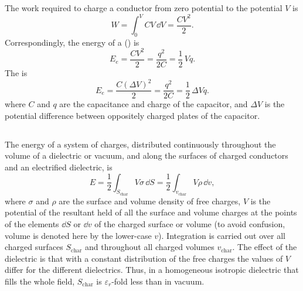 The work required to charge a conductor from zero potential to the potential $V$ is
\begin{equation*}%
W = \int_{0}^{V} CV \, \dd V = \frac{CV^{2}}{2}.
\end{equation*}
Correspondingly, the energy of a  () is
\begin{equation*}%
E_{e} = \frac{CV^{2}}{2} = \frac{q^{2}}{2C} = \frac{1}{2} \, Vq.
\end{equation*}
The  is
\begin{equation*}%
E_{e} = \frac{C(\Delta V)^{2}}{2} = \frac{q^{2}}{2C} = \frac{1}{2} \,\Delta Vq.
\end{equation*}
where $C$ and $q$ are the capacitance and charge of the capacitor, and $\Delta V$ is the potential difference between oppositely charged plates of the capacitor.

\subsection{}\label{19.1.2} The energy of a system of charges, distributed continuously throughout the volume of a dielectric or vacuum, and along the surfaces of charged conductors and an electrified dielectric, is
\begin{equation*}%
E = \frac{1}{2} \int_{S_{\text{char}}} V \sigma \, \dd S = \frac{1}{2} \int_{v_{\text{char}}} V \rho \, \dd v, 
\end{equation*}
where $\sigma$ and $\rho$ are the surface and volume density of free charges, $V$ is the potential of the resultant held of all the surface and volume charges at the points of the elements $\dd S$ or $\dd v$ of the charged surface or volume (to avoid confusion, volume is denoted here by the lower-case $v$). Integration is carried out over all charged surfaces $S_{\text{char}}$ and throughout all charged volumes $v_{\text{char}}$. The effect of the dielectric is that with a constant distribution of the free charges the values of $V$ differ for the different dielectrics. Thus, in a homogeneous isotropic dielectric that fills the whole field, $S_{\text{char}}$ is $\varepsilon_{r}$-fold less than in vacuum. 

